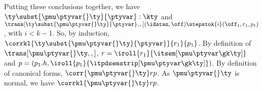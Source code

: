 \begin{list}{\textbf{Proof:}}{
      \setlength{\leftmargin}{0in}
      \setlength{\listparindent}{0in}}
\begin{caseproof}
  Putting these conclusions together, we have
  $\ty\subst{\pmu \ptyvar {} \ty}{\ptyvar} : \kty$ and $
  \trans[{\ty\subst{\pmu \ptyvar {} \ty}{\ptyvar}},,] (\idatan,\off)
    \stepstok{i} (\off_1,{r_1},p_1)$, with $i < k-1$. 
  So, by induction, $\corrkl{\ty\subst{\pmu \ptyvar {}
      \ty}{\ptyvar}}{r_1}{p_1}$.
  By definition of $\trans[{\pmu \ptyvar {} \ty},,]$, $r = \iroll
  {r_1}{\itsem[\pmu \ptyvar \gk \ty]}$ and
  $p = (p_1.h,\iroll {p_1}{\itpdsemstrip[\pmu \ptyvar\gk \ty]})$.
  By definition of canonical forms, $\corr{\pmu \ptyvar {} \ty} r p$.
  As ${\pmu \ptyvar {} \ty}$ is normal, we have 
  $\corrkl{\pmu \ptyvar {} \ty} r p$.
\end{caseproof}
\end{list}



